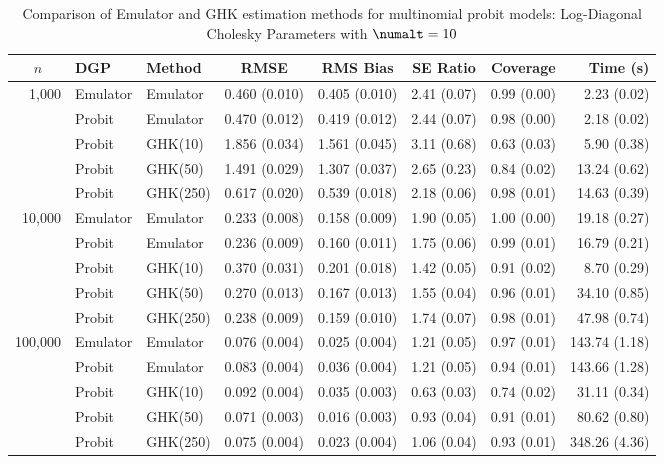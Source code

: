 \begin{table}[htbp]
\centering
\footnotesize
\begin{tabular}{@{}rllrrrrr@{}}
\toprule
\multicolumn{1}{c}{$n$} & \multicolumn{1}{l}{DGP} & \multicolumn{1}{l}{Method} & \multicolumn{1}{c}{RMSE} & \multicolumn{1}{c}{RMS Bias} & \multicolumn{1}{c}{SE Ratio} & \multicolumn{1}{c}{Coverage} & \multicolumn{1}{r}{Time (s)} \\
\midrule
\multirow{5}{*}{1,000} & Emulator & Emulator & 0.460 (0.010) & 0.405 (0.010) & 2.41 (0.07) & 0.99 (0.00) & 2.23 (0.02) \\
 & Probit & Emulator & 0.470 (0.012) & 0.419 (0.012) & 2.44 (0.07) & 0.98 (0.00) & 2.18 (0.02) \\
 & Probit & GHK(10) & 1.856 (0.034) & 1.561 (0.045) & 3.11 (0.68) & 0.63 (0.03) & 5.90 (0.38) \\
 & Probit & GHK(50) & 1.491 (0.029) & 1.307 (0.037) & 2.65 (0.23) & 0.84 (0.02) & 13.24 (0.62) \\
 & Probit & GHK(250) & 0.617 (0.020) & 0.539 (0.018) & 2.18 (0.06) & 0.98 (0.01) & 14.63 (0.39) \\
\midrule
\multirow{5}{*}{10,000} & Emulator & Emulator & 0.233 (0.008) & 0.158 (0.009) & 1.90 (0.05) & 1.00 (0.00) & 19.18 (0.27) \\
 & Probit & Emulator & 0.236 (0.009) & 0.160 (0.011) & 1.75 (0.06) & 0.99 (0.01) & 16.79 (0.21) \\
 & Probit & GHK(10) & 0.370 (0.031) & 0.201 (0.018) & 1.42 (0.05) & 0.91 (0.02) & 8.70 (0.29) \\
 & Probit & GHK(50) & 0.270 (0.013) & 0.167 (0.013) & 1.55 (0.04) & 0.96 (0.01) & 34.10 (0.85) \\
 & Probit & GHK(250) & 0.238 (0.009) & 0.159 (0.010) & 1.74 (0.07) & 0.98 (0.01) & 47.98 (0.74) \\
\midrule
\multirow{5}{*}{100,000} & Emulator & Emulator & 0.076 (0.004) & 0.025 (0.004) & 1.21 (0.05) & 0.97 (0.01) & 143.74 (1.18) \\
 & Probit & Emulator & 0.083 (0.004) & 0.036 (0.004) & 1.21 (0.05) & 0.94 (0.01) & 143.66 (1.28) \\
 & Probit & GHK(10) & 0.092 (0.004) & 0.035 (0.003) & 0.63 (0.03) & 0.74 (0.02) & 31.11 (0.34) \\
 & Probit & GHK(50) & 0.071 (0.003) & 0.016 (0.003) & 0.93 (0.04) & 0.91 (0.01) & 80.62 (0.80) \\
 & Probit & GHK(250) & 0.075 (0.004) & 0.023 (0.004) & 1.06 (0.04) & 0.93 (0.01) & 348.26 (4.36) \\
\bottomrule
\end{tabular}
\caption{Comparison of Emulator and GHK estimation methods for multinomial probit models: Log-Diagonal Cholesky Parameters with $\numalt=10$}
\label{tab:emulator_vs_ghk:10:ldiag}
\end{table}